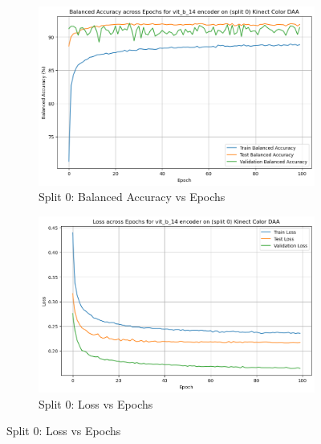 \begin{figure}[htbp]
    \centering
    \begin{subfigure}[b]{0.45\textwidth}
        \includegraphics[width=\textwidth]{Images_Thesis/Tensboard_runs_images_all/Experiment_02_Sel_Sup_D_A_no_Aug/Split_0/output_bal_acc_split_0_d_a_ssl.png}
        \caption{Split 0: Balanced Accuracy vs Epochs}
        \label{fig:Exp_3_01}
    \end{subfigure}
    \hfill %
    \begin{subfigure}[b]{0.45\textwidth}
        \includegraphics[width=\textwidth]{Images_Thesis/Tensboard_runs_images_all/Experiment_02_Sel_Sup_D_A_no_Aug/Split_0/output_loss_split_0_d_a_ssl.png}
        \caption{Split 0: Loss vs Epochs}
        \label{fig:Exp_3_02}
    \end{subfigure}


\end{figure}
